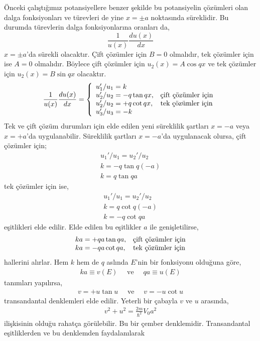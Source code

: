 \documentclass[a4paper,12pt, twoside]{article}
\begin{document}
Önceki çalıştığımız potansiyellere benzer şekilde bu potansiyelin çözümleri olan dalga fonksiyonları ve türevleri de yine $x=\pm a$ noktasında süreklidir. Bu durumda türevlerin dalga fonksiyonlarına oranları da,
\begin{equation}
\frac{1}{u(x)} \frac{d u(x)}{d x}
\end{equation}
$x=\pm a$'da sürekli olacaktır. Çift çözümler için $B=0$ olmalıdır, tek çözümler için ise $A=0$ olmalıdır. Böylece çift çözümler için $u_2(x) = A \cos qx$ ve tek çözümler için $u_2(x) = B \sin qx$ olacaktır.
\begin{align}
\frac{1}{u(x)} \frac{d u(x)}{d x} = \left\{ 
\begin{array} { l l } 
{u_1'/u_1 = k } & \\
{u_2'/u_2 = -q\tan qx }, & \text{çift çözümler için}\\
{u_2'/u_2 = +q\cot qx }, & \text{tek çözümler için}\\
{u_3'/u_3 = -k } & 
\end{array} \right. 
\end{align}
Tek ve çift çözüm durumları için elde edilen yeni süreklilik şartları $x=-a$ veya $x=+a$'da uygulanabilir. Süreklilik şartları $x=-a$'da uygulanacak olursa, çift çözümler için;
\begin{align}
u_1'/u_1 = u_2'/u_2 \nonumber\\
k = -q\tan q(-a) \nonumber\\
k = q\tan q a
\end{align}
tek çözümler için ise,
\begin{align}
u_1'/u_1 = u_2'/u_2 \nonumber\\
k = q\cot q(-a) \nonumber\\
k = -q\cot q a
\end{align}
eşitlikleri elde edilir. Elde edilen bu eşitlikler $a$ ile genişletilirse,
\begin{align}
\begin{array} { l l } 
ka = +qa\tan q a, & \text{çift çözümler için}\\
ka = -qa\cot q a, & \text{tek çözümler için}
\end{array}
\end{align}
hallerini alırlar. Hem $k$ hem de $q$ aslında $E$'nin bir fonksiyonu olduğuna göre, 
\begin{align}
ka \equiv v(E) \quad \text{ ve } \quad qa \equiv u(E)
\end{align}
tanımları yapılırsa, 
\begin{align}
v = +u\tan u \quad \text{ ve } \quad v = -u\cot u
\end{align}
transandantal denklemleri elde edilir. Yeterli bir çabayla $v$ ve $u$ arasında,
\begin{align}
v^2 + u^2 = \frac{2 m }{\hbar^{2}} V_0 a^2
\end{align}
ilişkisinin olduğu rahatça görülebilir. Bu bir çember denklemidir. Transandantal eşitliklerden ve bu denklemden faydalanılarak
\end{document}
